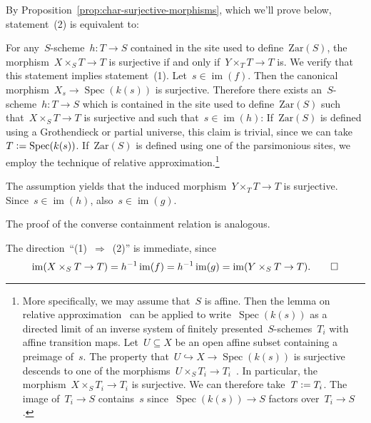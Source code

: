 \documentclass[10pt,reqno,a4paper]{amsbook}
\makeatletter
\theoremstyle{definition}
\theoremstyle{plain}
\theoremstyle{remark}
\newcommand{\Zar}{\mathrm{Zar}}
\DeclareMathOperator{\Spec}{Spec}
\DeclareMathOperator{\im}{im}
\newcommand{\?}{\,{:}\,}
\renewcommand{\_}{\mathpunct{.}\,}
\newcommand{\stacksproject}[1]{\cite[{\href{http://stacks.math.columbia.edu/tag/#1}{Tag~#1}}]{stacks-project}}
\newenvironment{indentblock}{%
  \list{}{\leftmargin\leftmargin}%
  \item\relax
}{%
  \endlist
}
\newcommand{\defeq}{\vcentcolon=}
\renewenvironment{proof}[1][\proofname]{\par
  \pushQED{\qed}%
  \normalfont \topsep6\p@\@plus6\p@\relax
  \trivlist
  \item[\hskip\labelsep
        \itshape
    #1\@addpunct{.}]\ignorespaces
}{%
  \popQED\endtrivlist\@endpefalse
}
\makeatother
\begin{document}
\begin{proof}By Proposition~\ref{prop:char-surjective-morphisms}, which we'll
prove below, statement~(2) is equivalent to:
\begin{indentblock}
For any~$S$-scheme~$h : T \to S$ contained in the site used to
define~$\Zar(S)$, the morphism~$X \times_S T \to T$ is surjective if and only
if~$Y \times_T T \to T$ is.
\end{indentblock}
We verify that this statement implies statement~(1). Let~$s \in \im(f)$. Then the canonical
morphism~$X_s \to \Spec(k(s))$ is surjective. Therefore there exists
an~$S$-scheme~$h : T \to S$ which is contained in the site used to
define~$\Zar(S)$ such that~$X \times_S T \to T$ is surjective and such that~$s
\in \im(h)$: If~$\Zar(S)$ is defined using a Grothendieck or partial universe,
this claim is trivial, since we can take~$T \defeq \Spec(k(s))$. If~$\Zar(S)$
is defined using one of the parsimonious sites, we employ the technique of
relative approximation.\footnote{More specifically, we may assume that~$S$ is
affine. Then the lemma on relative approximation~\stacksproject{09MV} can be
applied to write~$\Spec(k(s))$ as a directed limit of an inverse system of
finitely presented~$S$-schemes~$T_i$ with affine transition maps. Let~$U
\subseteq X$ be an open affine subset containing a preimage of~$s$. The
property that~$U \hookrightarrow X \to \Spec(k(s))$ is surjective descends to
one of the morphisms~$U \times_S T_i \to T_i$~\stacksproject{07RR}. In
particular, the morphism~$X \times_S T_i \to T_i$ is surjective. We can
therefore take~$T \defeq T_i$. The image of~$T_i \to S$ contains~$s$
since~$\Spec(k(s)) \to S$ factors over~$T_i \to S$.}

The assumption yields that the induced morphism~$Y \times_T T \to T$ is
surjective. Since~$s \in \im(h)$, also~$s \in \im(g)$.

The proof of the converse containment relation is analogous.

The direction~``(1)~$\Rightarrow$~(2)'' is immediate, since
\[ \im(X \times_S T \to T) = h^{-1} \im(f) = h^{-1} \im(g) = \im(Y \times_S T \to T).
  \qedhere \]
\end{proof}
\end{document}
